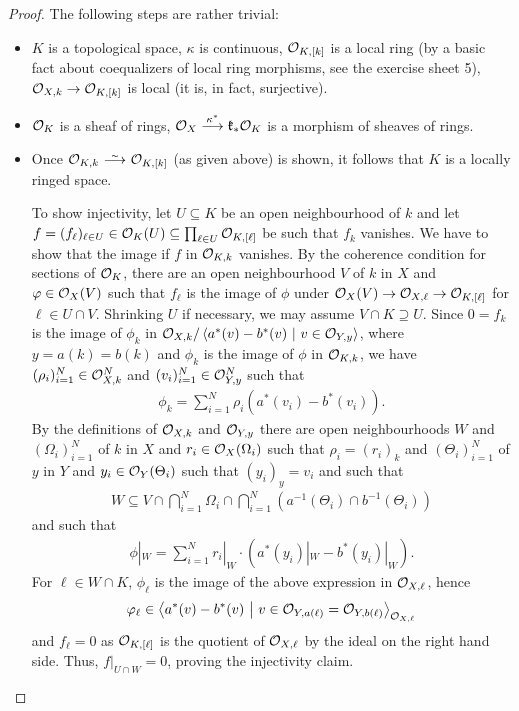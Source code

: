 \documentclass[a4paper,parskip=half,numbers=enddot, DIV=12]{scrreprt}
\begin{document}
\begin{proof}
    The following steps are rather trivial:
    \begin{itemize}
      \item 
        $K$ is a topological space, $\kappa$ is continuous, $\mathcal{O}_{K,[k]}$ is a local ring (by a basic fact about coequalizers of local ring morphisms, see the exercise sheet 5), $\Oo_{X,k} \morphism \Oo_{K,[k]}$ is local (it is, in fact, surjective).
      \item 
        $\mathcal{O}_K$ is a sheaf of rings, $\Oo_X \morphism[\kappa^*] \kk_*\Oo_K$ is a morphism of sheaves of rings.
      \item 
        Once $\Oo_{K,k} \isomorphism \Oo_{K,[k]}$ (as given above) is shown, it follows that $K$ is a locally ringed space. 
        
        To show injectivity, let $U\subseteq K$ be an open neighbourhood of $k$ and let $f= (f_\ell)_{\ell\in U} \in \mathcal{O}_K(U) \subseteq \prod_{\ell\in U} \mathcal{O}_{K,[\ell]}$ be such that $f_k$ vanishes. We have to show that the image if $f$ in $\mathcal{O}_{K,k}$ vanishes. By the coherence condition for sections of $\mathcal{O}_K$, there are an open neighbourhood $V$ of $k$ in $X$ and $\varphi\in \mathcal{O}_X(V)$ such that $f_\ell$ is the image of $\phi$ under $\Oo_X(V) \morphism\Oo_{X,\ell} \morphism\Oo_{K,[\ell]}$ for $\ell\in U\cap V$. Shrinking $U$ if necessary, we may assume $V\cap K \supseteq U$. Since $0 = f_k$ is the image of $\phi_k$ in $\mathcal{O}_{X,k}/\left\langle a^*(v)-b^*(v)\ \middle|\  v\in \mathcal{O}_{Y,y}\right\rangle$, where $y=a(k)=b(k)$ and $\phi_k$ is the image of $\phi$ in $\mathcal{O}_{K,k}$, we have $(\rho_i)_{i=1}^N\in \mathcal{O}_{X,k}^N$ and $(v_i)_{i=1}^N\in \mathcal{O}_{Y,y}^N$ such that
        \begin{align*}
            \phi_k = \sum_{i=1}^N \rho_i(a^*(v_i) -b^*(v_i)).
        \end{align*}
        By the definitions of $\mathcal{O}_{X,k}$ and $\mathcal{O}_{Y,y}$ there are open neighbourhoods $W$ and $(\Omega_i)_{i=1}^N$ of $k$ in $X$ and $r_i \in \mathcal{O}_X(\Omega_i)$ such that $\rho_i = (r_i)_k$ and $(\Theta_i)_{i=1}^N$ of $y$ in $Y$ and $y_i \in \mathcal{O}_Y(\Theta_i)$ such that $(y_i)_y = v_i$ and such that 
        \begin{align*}
            W\subseteq V\cap \bigcap_{i=1}^N \Omega_i \cap\bigcap_{i=1}^N \left(a^{-1}(\Theta_i) \cap b^{-1}(\Theta_i)\right)
        \end{align*}
        and such that 
        \begin{align*}
            \phi|_W = \sum_{i=1}^N r_i|_W \cdot \left(a^*(y_i)|_W -b^*(y_i)|_W\right).
        \end{align*}
        For $\ell\in W\cap K$, $\phi_\ell$ is the image of the above expression in $\mathcal{O}_{X,\ell}$, hence 
        \begin{align*}
            \varphi_\ell\in \left\langle a^*(v) -b^*(v)\ \middle|\  v\in \mathcal{O}_{Y,a(\ell)} = \mathcal{O}_{Y,b(\ell)}\right\rangle_{\mathcal{O}_{X,\ell}}
        \end{align*}
        and $f_\ell =0$ as $\mathcal{O}_{K,[\ell]}$ is the quotient of $\mathcal{O}_{X,\ell}$ by the ideal on the right hand side. Thus, $f|_{U\cap W} =0$, proving the injectivity claim.
    \end{itemize}

\end{proof}
    
\end{document}
